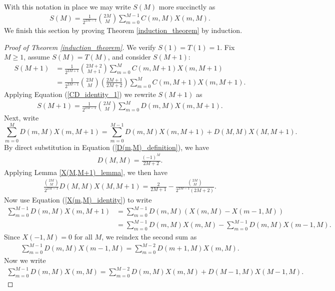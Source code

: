 \documentclass{amsart}
\theoremstyle{plain}
\theoremstyle{remark}
\begin{document}
With this notation in place we may write $S(M)$ more succinctly as
\begin{align} \label{new_S(M)_definition}
S(M) = \frac{1}{2^{2M-1}} \binom{2M}{M} \sum_{m=0}^{M-1} C(m,M)X(m,M).
\end{align}
We finish this section by proving Theorem \ref{induction_theorem} by induction.

\begin{proof}[Proof of Theorem \ref{induction_theorem}]
We verify $S(1) = T(1) =1$.  Fix $M \geq 1$, assume $S(M) = T(M)$, and consider $S(M+1)$:
\begin{align*}
S(M+1) &= \frac{1}{2^{2M+1}} \binom{2M+2}{M+1}\sum_{m=0}^M C(m,M+1)X(m,M+1) \\
&=  \frac{1}{2^{2M-1}} \binom{2M}{M}  \left(\frac{2M+1}{2M+2}\right) \sum_{m=0}^M C(m,M+1)X(m,M+1).
\end{align*}
Applying Equation (\ref{CD_identity_1}) we  rewrite $S(M+1)$ as
\begin{align}\label{S(M+1)_rewritten}
S(M+1) = \frac{1}{2^{2M-1}} \binom{2M}{M} \sum_{m=0}^{M} D(m,M)X(m,M+1).
\end{align}
Next, write
\[
\sum_{m=0}^{M} D(m,M)X(m,M+1) =\sum_{m=0}^{M-1} D(m,M)X(m,M+1) + D(M,M)X(M,M+1).
\]
By direct substitution in Equation (\ref{D(m,M)_definition}), we have 
\begin{align} \label{D(M,M)}
D(M,M) = \frac{(-1)^M}{2M+2}.
\end{align}
Applying Lemma \ref{X(M,M+1)_lemma}, we then have 
\begin{align} \label{D(M,M)X(M,M+1)}
\frac{\binom{2M}{M}}{2^{2M-1}}D(M,M)X(M,M+1) = \frac{2}{2M+1} - \frac{\binom{2M}{M}}{2^{2M-1}(2M+2)}.
\end{align}
Now use Equation (\ref{X(m,M)_identity}) to write
\begin{align*}
\sum_{m=0}^{M-1} D(m,M)X(m,M+1) &= \sum_{m=0}^{M-1} D(m,M)\left(X(m,M) - X(m-1,M)\right) \\
&=\sum_{m=0}^{M-1} D(m,M)X(m,M) - \sum_{m=0}^{M-1} D(m,M)X(m-1,M).
\end{align*}
Since $X(-1,M) = 0$ for all $M$, we reindex the second sum as
\begin{align} \label{reindex}
\sum_{m=0}^{M-1} D(m,M)X(m-1,M) = \sum_{m=0}^{M-2} D(m+1,M)X(m,M).
\end{align}
Now we write
\begin{align} \label{breakup}
\sum_{m=0}^{M-1} D(m,M)X(m,M) = \sum_{m=0}^{M-2} D(m,M)X(m,M) + D(M-1,M)X(M-1,M).
\end{align}

\end{proof}
\end{document}
